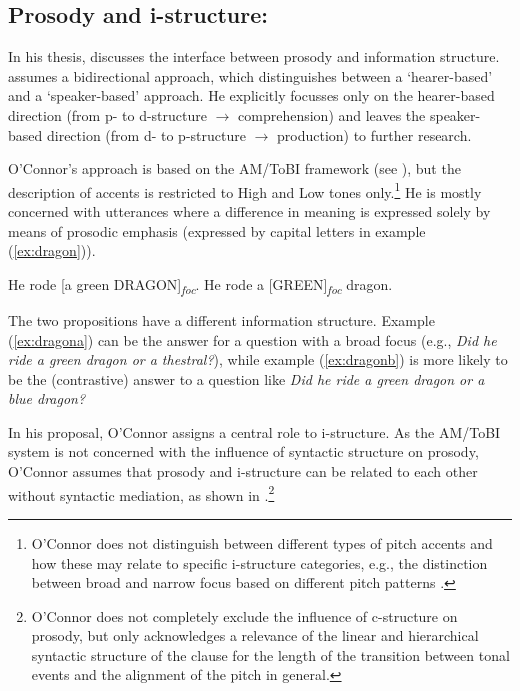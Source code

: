 \documentclass[output=paper,hidelinks]{langscibook}
\begin{document}
\subsection{Prosody and i-structure: \citet{Oconnor2005}}
\label{subsec:OConnor}
In his thesis, \citet{Oconnor2005} discusses the interface between prosody and information structure.
\citet{Oconnor2005} assumes a bidirectional approach, which distinguishes between a `hearer-based'  and a `speaker-based' approach. He explicitly focusses only on the hearer-based direction (from p- to d-structure $\rightarrow$ comprehension) and leaves the speaker-based direction (from d- to p-structure $\rightarrow$ production) to further research.

\largerpage
O'Connor's approach is based on the AM/ToBI framework (see ), but the description of accents is restricted to High and Low tones only.\footnote{O'Connor does not distinguish  between different types of pitch accents and how these may relate to specific i-structure categories, e.g., the distinction between broad and narrow focus based on different pitch patterns \citep[a.o.,][]{Baumannetal2007}.} %
He is mostly concerned with utterances where a difference in meaning is expressed solely by means of prosodic emphasis (expressed by capital letters in example (\ref{ex:dragon})).

\ea\label{ex:dragon}
\ea\label{ex:dragona} He rode [a green DRAGON]\textsubscript{\textit{foc}}.
\ex\label{ex:dragonb} He rode a [GREEN]\textsubscript{\textit{foc}} dragon.
\z\z


\noindent The two propositions have a different information structure. Example (\ref{ex:dragona}) can be the answer for a question with a broad focus (e.g., {\em Did he ride a green dragon or a thestral?}\/), while example (\ref{ex:dragonb}) is more likely to be the (contrastive) answer to a question like {\em Did he ride a green dragon or a blue dragon?}

In his proposal, O'Connor assigns a central role to i-structure. 
As the AM/ToBI system is not concerned with the influence of syntactic structure on prosody, 
 O'Connor assumes that prosody and i-structure can be related to each other without syntactic mediation, as shown in .\footnote{O'Connor does not completely exclude the influence of c-structure on prosody, but only acknowledges a relevance of the linear and hierarchical syntactic structure of the clause for  the length of the transition between tonal events and the alignment of the pitch in general.}
\end{document}
